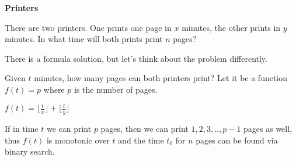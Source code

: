 \begin{problem}\textbf{Printers}

    There are two printers. One prints one page in $x$ minutes, the other prints in $y$ minutes. In what time will both prints print $n$ pages?

\end{problem}

\begin{solution}

    There is a formula solution, but let's think about the problem differently.

    Given $t$ minutes, how many pages can both printers print? Let it be a function $f(t) = p$ where $p$ is the number of pages.

    $f(t) = \lfloor \frac{t}{x} \rfloor + \lfloor \frac{t}{y} \rfloor$

    If in time $t$ we can print $p$ pages, then we can print $1, 2, 3, .., p-1$ pages as well, thus $f(t)$ is monotonic over $t$ and the time $t_0$ for $n$ pages can be found via binary search.

\end{solution}
